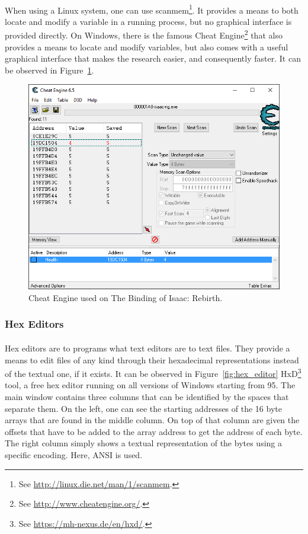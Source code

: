 \paragraph{}
When using a Linux system, one can use scanmem\footnote{See \url{http://linux.die.net/man/1/scanmem}.}. It provides a means to both locate and modify a variable in a running process, but no graphical interface is provided directly. On Windows, there is the famous Cheat Engine\footnote{See \url{http://www.cheatengine.org/}.} that also provides a means to locate and modify variables, but also comes with a useful graphical interface that makes the research easier, and consequently faster. It can be observed in Figure~\ref{fig:cheat_engine}. 

\begin{figure}[!htb]
	\centering
	\includegraphics[width=1\textwidth]{reverse_engineering/cheat_engine.png}
	\caption{Cheat Engine used on The Binding of Isaac: Rebirth.}
	\label{fig:cheat_engine}
\end{figure}

\subsubsection{Hex Editors}
\paragraph{}
Hex editors are to programs what text editors are to text files. They provide a means to edit files of any kind through their hexadecimal representations instead of the textual one, if it exists. It can be observed in Figure~\ref{fig:hex_editor} HxD\footnote{See \url{https://mh-nexus.de/en/hxd/}.} tool, a free hex editor running on all versions of Windows starting from 95. The main window contains three columns that can be identified by the spaces that separate them. On the left, one can see the starting addresses of the 16 byte arrays that are found in the middle column. On top of that column are given the offsets that have to be added to the array address to get the address of each byte. The right column simply shows a textual representation of the bytes using a specific encoding. Here, ANSI is used.

